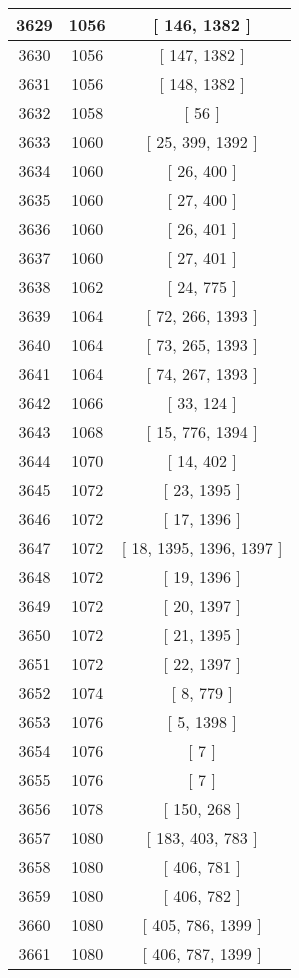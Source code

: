 \begin{center}
\begin{longtable}[H]{|| c c c ||}
\hline
3629 & 1056 & [ 146, 1382 ] \\ 
\hline
3630 & 1056 & [ 147, 1382 ] \\ 
\hline
3631 & 1056 & [ 148, 1382 ] \\ 
\hline
3632 & 1058 & [ 56 ] \\ 
\hline
3633 & 1060 & [ 25, 399, 1392 ] \\ 
\hline
3634 & 1060 & [ 26, 400 ] \\ 
\hline
3635 & 1060 & [ 27, 400 ] \\ 
\hline
3636 & 1060 & [ 26, 401 ] \\ 
\hline
3637 & 1060 & [ 27, 401 ] \\ 
\hline
3638 & 1062 & [ 24, 775 ] \\ 
\hline
3639 & 1064 & [ 72, 266, 1393 ] \\ 
\hline
3640 & 1064 & [ 73, 265, 1393 ] \\ 
\hline
3641 & 1064 & [ 74, 267, 1393 ] \\ 
\hline
3642 & 1066 & [ 33, 124 ] \\ 
\hline
3643 & 1068 & [ 15, 776, 1394 ] \\ 
\hline
3644 & 1070 & [ 14, 402 ] \\ 
\hline
3645 & 1072 & [ 23, 1395 ] \\ 
\hline
3646 & 1072 & [ 17, 1396 ] \\ 
\hline
3647 & 1072 & [ 18, 1395, 1396, 1397 ] \\ 
\hline
3648 & 1072 & [ 19, 1396 ] \\ 
\hline
3649 & 1072 & [ 20, 1397 ] \\ 
\hline
3650 & 1072 & [ 21, 1395 ] \\ 
\hline
3651 & 1072 & [ 22, 1397 ] \\ 
\hline
3652 & 1074 & [ 8, 779 ] \\ 
\hline
3653 & 1076 & [ 5, 1398 ] \\ 
\hline
3654 & 1076 & [ 7 ] \\ 
\hline
3655 & 1076 & [ 7 ] \\ 
\hline
3656 & 1078 & [ 150, 268 ] \\ 
\hline
3657 & 1080 & [ 183, 403, 783 ] \\ 
\hline
3658 & 1080 & [ 406, 781 ] \\ 
\hline
3659 & 1080 & [ 406, 782 ] \\ 
\hline
3660 & 1080 & [ 405, 786, 1399 ] \\ 
\hline
3661 & 1080 & [ 406, 787, 1399 ] \\ 

\end{longtable}
\end{center}

